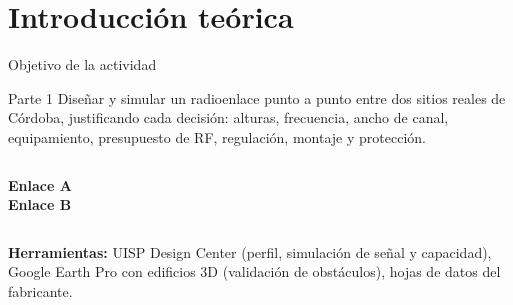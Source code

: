 \renewcommand{\seccorta}{Teoría}
\section{Introducción teórica}

\begin{frame}{Objetivo de la actividad}
  \begin{block}{Parte 1}
    Diseñar y simular un radioenlace punto a punto entre dos sitios reales de Córdoba,
    justificando cada decisión: alturas, frecuencia, ancho de canal, equipamiento,
    presupuesto de RF, regulación, montaje y protección.
  \end{block}
  \vspace{4pt}
  \begin{columns}[T]
    \textbf{Enlace A}\\ \EAnombre
    \textbf{Enlace B}\\ \EBnombre
  \end{columns}
  \vspace{8pt}
  \textbf{Herramientas:} UISP Design Center (perfil, simulación de señal y capacidad),
  Google Earth Pro con edificios 3D (validación de obstáculos), hojas de datos del fabricante.
\end{frame}

